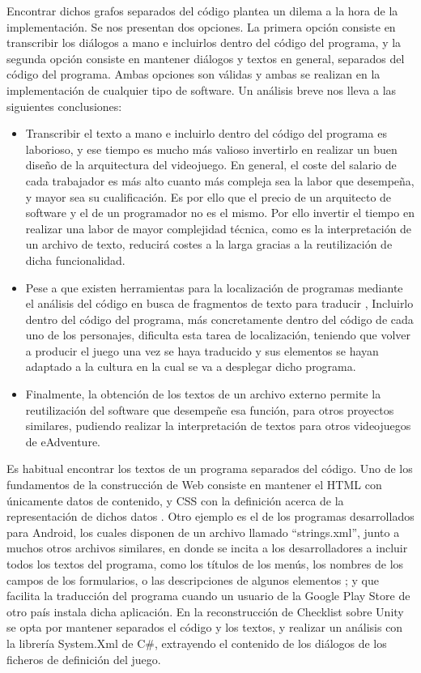 Encontrar dichos grafos separados del código plantea un dilema a la hora de la implementación. Se nos presentan dos opciones. La primera opción consiste en transcribir los diálogos a mano e incluirlos dentro del código del programa, y la segunda opción consiste en mantener diálogos y textos en general, separados del código del programa. Ambas opciones son válidas y ambas se realizan en la implementación de cualquier tipo de software. Un análisis breve nos lleva a las siguientes conclusiones: 

\begin{itemize}
	\item 
	Transcribir el texto a mano e incluirlo dentro del código del programa es laborioso, y ese tiempo es mucho más valioso invertirlo en realizar un buen diseño de la arquitectura del videojuego. En general, el coste del salario de cada trabajador es más alto cuanto más compleja sea la labor que desempeña, y mayor sea su cualificación. Es por ello que el precio de un arquitecto de software y el de un programador no es el mismo. Por ello invertir el tiempo en realizar una labor de mayor complejidad técnica, como es la interpretación de un archivo de texto, reducirá costes a la larga gracias a la reutilización de dicha funcionalidad.
	\item 
	Pese a que existen herramientas para la localización de programas mediante el análisis del código en busca de fragmentos de texto para traducir \cite{TorresMolina2007}, Incluirlo dentro del código del programa, más concretamente dentro del código de cada uno de los personajes, dificulta esta tarea de localización, teniendo que volver a producir el juego una vez se haya traducido y sus elementos se hayan adaptado a la cultura en la cual se va a desplegar dicho programa. 
	\item
	Finalmente, la obtención de los textos de un archivo externo permite la reutilización del software que desempeñe esa función, para otros proyectos similares, pudiendo realizar la interpretación de textos para otros videojuegos de eAdventure. 
\end{itemize}

Es habitual encontrar los textos de un programa separados del código. Uno de los fundamentos de la construcción de Web consiste en mantener el HTML con únicamente datos de contenido, y CSS con la definición acerca de la representación de dichos datos \cite{cssseparar}. Otro ejemplo es el de los programas desarrollados para Android, los cuales disponen de un archivo llamado “strings.xml”, junto a muchos otros archivos similares, en donde se incita a los desarrolladores a incluir todos los textos del programa, como los títulos de los menús, los nombres de los campos de los formularios, o las descripciones de algunos elementos \cite{Reina2012}; y que facilita la traducción del programa cuando un usuario de la Google Play Store de otro país instala dicha aplicación. En la reconstrucción de Checklist sobre Unity se opta por mantener separados el código y los textos, y realizar un análisis con la librería System.Xml de C\#, extrayendo el contenido de los diálogos de los ficheros de definición del juego. 

